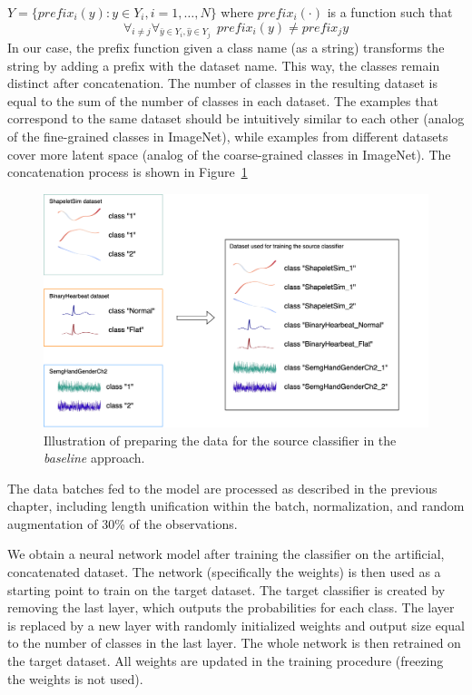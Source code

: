 \documentclass[a4paper,11pt,twoside]{report}
\theoremstyle{definition}
\begin{document}
$Y = \{prefix_i(y): y \in Y_i, i=1, \dots, N\}$
where $prefix_i(\cdot)$ is a function such that $$\forall_{i\neq j} \forall_{\bar{y} \in Y_i, \hat{y} \in Y_j} \ \  prefix_i(y) \neq prefix_j{y}$$
In our case, the prefix function given a class name (as a string) transforms the string by adding a prefix with the dataset name. This way, the classes remain distinct after concatenation. The number of classes in the resulting dataset is equal to the sum of the number of classes in each dataset. The examples that correspond to the same dataset should be intuitively similar to each other (analog of the fine-grained classes in ImageNet), while examples from different datasets cover more latent space (analog of the coarse-grained classes in ImageNet). The concatenation process is shown in Figure~\ref{fig:baseline_dataset}


\FloatBarrier
\begin{figure}[h!]
\centering
\includegraphics[width=17cm]{imgs/baseline.drawio.png}
\caption{Illustration of preparing the data for the source classifier in the \textit{ baseline} approach.}
\label{fig:baseline_dataset}
\end{figure}

\FloatBarrier
The data batches fed to the model are processed as described in the previous chapter, including length unification within the batch, normalization, and random augmentation of 30\% of the observations.

We obtain a neural network model after training the classifier on the artificial, concatenated dataset. The network (specifically the weights) is then used as a starting point to train on the target dataset. The target classifier is created by removing the last layer, which outputs the probabilities for each class. The layer is replaced by a new layer with randomly initialized weights and output size equal to the number of classes in the last layer. The whole network is then retrained on the target dataset. All weights are updated in the training procedure (freezing the weights is not used).
\end{document}
